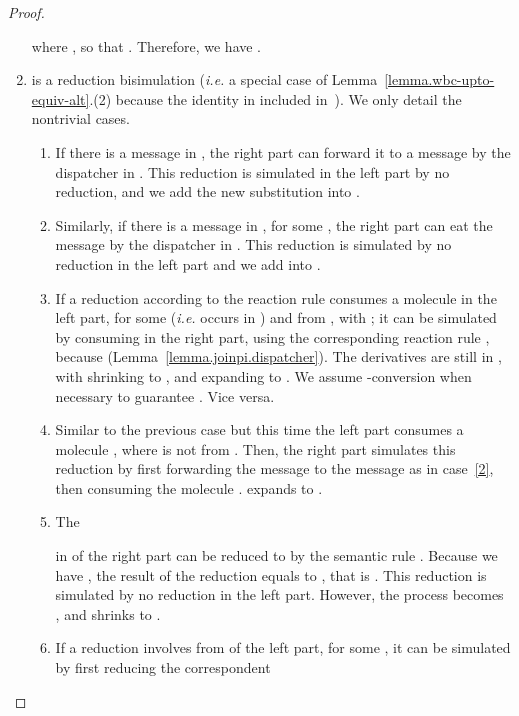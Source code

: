 \documentclass{LMCS}
\makeatletter
\newcommand{\rln}[1]{\text{\small\sc #1}}
\newcommand{\ie}{\emph{i.e.}\@\xspace}
\renewcommand{\_}{\mathord{\rule[-.25ex]{1ex}{.15ex}}}
\makeatother
\begin{document}
\begin{proof}
\begin{enumerate}[]
    where , so that . Therefore, we have
    .
  \item  is a reduction bisimulation (\ie a special case of
    Lemma~\ref{lemma.wbc-upto-equiv-alt}.(2) because the identity in
    included in~). We only detail the nontrivial cases.
    \begin{enumerate}[(1)]
    \item If there is a message  in , the
      right part can forward it to a message
       by the dispatcher
      in . This reduction is simulated in the left part by no
      reduction, and we add the new substitution  into
      .
    \item\label{2} Similarly, if there is a message  in ,
      for some , the right part can eat the message by
      the dispatcher in . This reduction is simulated by no
      reduction in the left part and we add  into .
    \item If a reduction according to the reaction rule
       consumes a molecule
       in the left part, for
      some  (\ie 
      occurs in ) and  from , with
      ; it can be simulated by consuming
       in
      the right part, using the corresponding reaction rule
      , because 
      (Lemma~\ref{lemma.joinpi.dispatcher}). The derivatives are still
      in , with  shrinking to ,
      and  expanding to . We
      assume -conversion when necessary to guarantee
      .  Vice versa.
    \item Similar to the previous case but this time the left part
      consumes a molecule ,
      where  is not from . Then, the right part
      simulates this reduction by first forwarding the message
       to the message
       as in case~\ref{2},
      then consuming the molecule
      .
       expands to .
    \item The
      
      in  of the right part can be reduced to
       by the semantic rule
      \rln{Match}.  Because we have
      ,
      the result of the reduction equals to
      , that is
      . This reduction is simulated by no reduction in
      the left part.  However, the process  becomes
      , and  shrinks to
      .
    \item If a reduction involves  from  of the left
      part, for some , it can be simulated by first
      reducing the correspondent
      

\end{enumerate}
\end{enumerate}
\end{proof}
\end{document}
